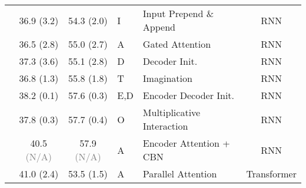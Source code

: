 \documentclass{svjour3}
\newcommand{\uua}[0]{}
\newcommand{\dda}[0]{}
\newcommand{\sspn}[1]{\textcolor{ssp}{(\uua #1)}}
\newcommand{\ssmn}[1]{\textcolor{ssm}{(\dda #1)}}
\newcommand{\na}[0]{\textcolor{gray}{(N/A)}}
\begin{document}
\begin{table}[t]
{\begin{tabular}{@{}lccllc@{}}
\citet{calixto-incorporating-2017}        & 36.9 \sspn{3.2}   & 54.3 \sspn{2.0}   & I   & Input Prepend \& Append & RNN     \\
  
\citet{calixto-doubly-2017}               & 36.5 \sspn{2.8}   & 55.0 \sspn{2.7}   & A   & Gated Attention    &  RNN    \\

\citet{calixto-incorporating-2017}        & 37.3 \sspn{3.6}   & 55.1 \sspn{2.8}   & D   & Decoder Init.       &  RNN   \\

\citet{elliott-imagination-2017}          & 36.8 \sspn{1.3}   & 55.8 \sspn{1.8}   & T   & Imagination        & RNN     \\
  
\citet{caglayan-lium-cvc-2017}            & 38.2 \sspn{0.1}   & 57.6 \sspn{0.3}   & E,D  & Encoder Decoder Init.  & RNN    \\
                                            & 37.8 \ssmn{0.3}   & 57.7 \sspn{0.4}   & O    & Multiplicative Interaction & RNN \\
  
\citet{delbrouck-modulating-2017}         & 40.5 \na          & 57.9 \na          & A    & Encoder Attention + CBN & RNN  \\
  \midrule


\citet{arslan-doubly-2018}                & 41.0 \sspn{2.4}   & 53.5 \ssmn{1.5}  & A    & Parallel Attention  & Transformer   \\


\end{tabular}}
\end{table}
\end{document}
